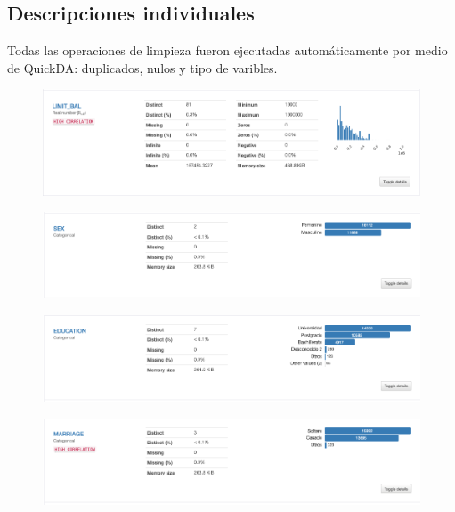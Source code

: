 \subsection{Descripciones individuales}
\begin{cajita}
	Todas las operaciones de limpieza fueron ejecutadas automáticamente por medio de QuickDA: duplicados, nulos y tipo de varibles. 
\end{cajita}

\begin{figure}[H]
	\centering
	\includegraphics[scale=0.4]{Images/3}
\end{figure}
\begin{figure}[H]
	\centering
	\includegraphics[scale=0.4]{Images/4}
\end{figure}
\begin{figure}[H]
	\centering
	\includegraphics[scale=0.4]{Images/5}
\end{figure}
\begin{figure}[H]
	\centering
	\includegraphics[scale=0.4]{Images/6}
\end{figure}
